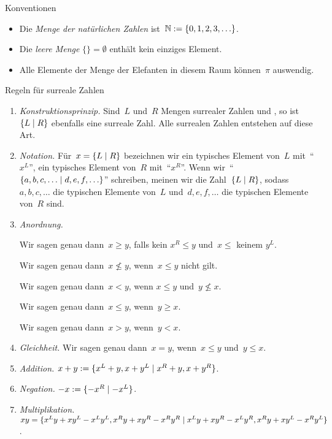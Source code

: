 \documentclass{zirkelblatt}
\begin{document}

\begin{block}{Konventionen}
\begin{itemize}
\item[]
Die \emph{Menge der natürlichen Zahlen} ist~$\mathbb{N} := \{ 0, 1, 2, 3, \ldots \}$.
\item[]
Die \emph{leere Menge} $\{ \} = \emptyset$ enthält kein einziges Element.
\item[]
Alle Elemente der Menge der Elefanten in diesem Raum können~$\pi$ auswendig.
\end{itemize}
\end{block}

\begin{block}{Regeln für surreale Zahlen}
\renewcommand{\labelenumi}{\arabic{enumi}.}
\begin{enumerate}
\item \emph{Konstruktionsprinzip.}
Sind~$L$ und~$R$ Mengen surrealer Zahlen und , so ist~$\{ L \mathrel{|} R \}$ ebenfalls eine surreale
Zahl. Alle surrealen Zahlen entstehen auf diese Art.

\item \emph{Notation.}
Für~$x = \{ L \mathrel{|} R \}$ bezeichnen wir ein typisches Element von~$L$
mit~"`$x^L$"', ein typisches Element von~$R$ mit~"`$x^R$"'. Wenn
wir~"`$\{ a,b,c,\ldots \mathrel{|} d,e,f,\ldots \}$"' schreiben, meinen wir die
Zahl~$\{ L \mathrel{|} R \}$, sodass~$a,b,c,\ldots$ die typischen Elemente von~$L$
und~$d,e,f,\ldots$ die typischen Elemente von~$R$ sind.

\item \emph{Anordnung.}

Wir sagen genau dann~$x \geq y$, falls kein $x^R \leq y$ und~$x \leq$
keinem $y^L$.

Wir sagen genau dann~$x \not\leq y$, wenn~$x \leq y$ nicht gilt.

Wir sagen genau dann~$x < y$, wenn $x \leq y$ und~$y \not\leq x$.

Wir sagen genau dann~$x \leq y$, wenn~$y \geq x$.

Wir sagen genau dann~$x > y$, wenn~$y < x$.

\item \emph{Gleichheit.}
Wir sagen genau dann~$x = y$, wenn~$x \leq y$ und~$y \leq x$.

\item \emph{Addition.} $x + y := \{ x^L + y, x + y^L \mathrel{|} x^R + y, x + y^R \}$.

\item \emph{Negation.} $-x := \{ -x^R \mathrel{|} -x^L \}$.

\item \emph{Multiplikation.}
$xy = \{ x^Ly + xy^L - x^Ly^L, x^Ry + xy^R - x^Ry^R \mathrel{|} x^Ly + xy^R -
x^Ly^R, x^Ry + xy^L - x^Ry^L \}$.
\end{enumerate}
\end{block}
\end{document}
